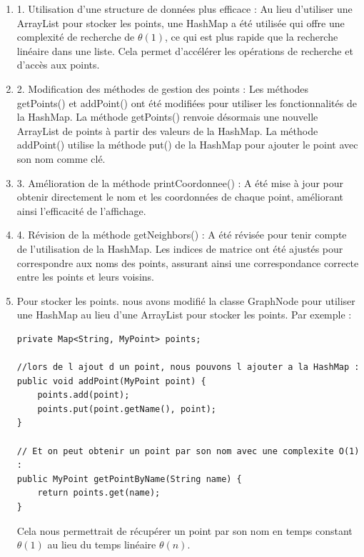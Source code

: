 \documentclass[hidelinks,letterpaper,12pt]{article}
\begin{document}
\begin{enumerate}
\item 1. Utilisation d'une structure de données plus efficace : Au lieu d'utiliser une ArrayList pour stocker les points, une HashMap a été utilisée qui offre une complexité de recherche de \( \theta(1)\), ce qui est plus rapide que la recherche linéaire dans une liste. Cela permet d'accélérer les opérations de recherche et d'accès aux points.

\item 2. Modification des méthodes de gestion des points : Les méthodes getPoints() et addPoint() ont été modifiées pour utiliser les fonctionnalités de la HashMap. La méthode getPoints() renvoie désormais une nouvelle ArrayList de points à partir des valeurs de la HashMap. La méthode addPoint() utilise la méthode put() de la HashMap pour ajouter le point avec son nom comme clé.

\item 3. Amélioration de la méthode printCoordonnee() : A été mise à jour pour obtenir directement le nom et les coordonnées de chaque point, améliorant ainsi l'efficacité de l'affichage.

\item 4. Révision de la méthode getNeighbors() : A été révisée pour tenir compte de l'utilisation de la HashMap. Les indices de matrice ont été ajustés pour correspondre aux noms des points, assurant ainsi une correspondance correcte entre les points et leurs voisins.

\item Pour stocker les points. nous avons modifié la classe GraphNode pour utiliser une HashMap au lieu d'une ArrayList pour stocker les points. Par exemple :
\\
\begin{lstlisting}[caption={Extrait de code de la classe GraphNode.}, label={Extrait de code de la classe GraphNode.}]
private Map<String, MyPoint> points;
	
//lors de l ajout d un point, nous pouvons l ajouter a la HashMap :
public void addPoint(MyPoint point) {
	points.add(point);
	points.put(point.getName(), point);
}
	
// Et on peut obtenir un point par son nom avec une complexite O(1) :
public MyPoint getPointByName(String name) {
	return points.get(name);
}
\end{lstlisting}

Cela nous permettrait de récupérer un point par son nom en temps constant \( \theta(1)\) au lieu du temps linéaire \( \theta(n)\).


\end{enumerate}
\end{document}
